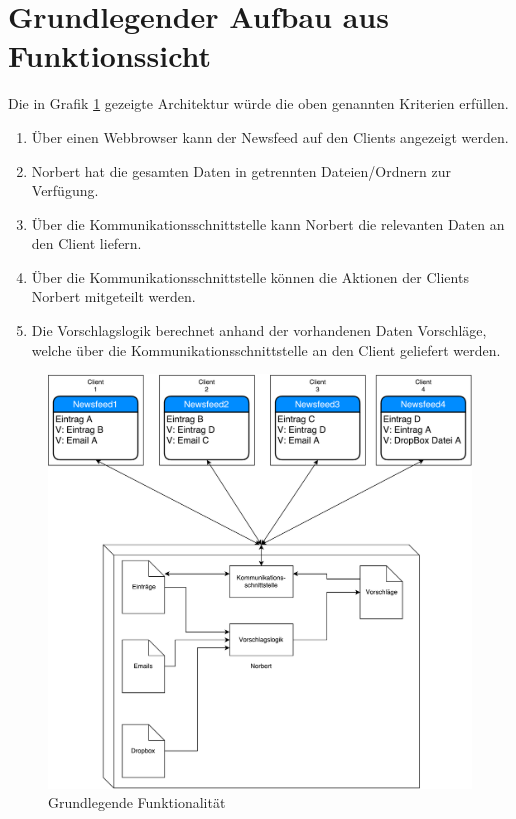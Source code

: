 \section[Grundlegender Aufbau]{Grundlegender Aufbau aus Funktionssicht}


  Die in Grafik \ref{fig: Overview_HLVL} gezeigte Architektur würde die oben genannten Kriterien erfüllen.
  \begin{enumerate}
  	\item Über einen Webbrowser kann der Newsfeed auf den Clients angezeigt werden.
  	\item Norbert hat die gesamten Daten in getrennten Dateien/Ordnern zur Verfügung.
  	\item Über die Kommunikationsschnittstelle kann Norbert die relevanten Daten an den Client liefern.
  	\item Über die Kommunikationsschnittstelle können die Aktionen der Clients Norbert mitgeteilt werden.
  	\item Die Vorschlagslogik berechnet anhand der vorhandenen Daten Vorschläge, welche über die Kommunikationsschnittstelle an den Client geliefert werden.
  	\end{enumerate}

  	
\begin{figure}[H]
\centering
\includegraphics[scale=0.6]{uml-diagramms/overview_hlvl.pdf}
\caption{Grundlegende Funktionalität}
\label{fig: Overview_HLVL}
\end{figure}

